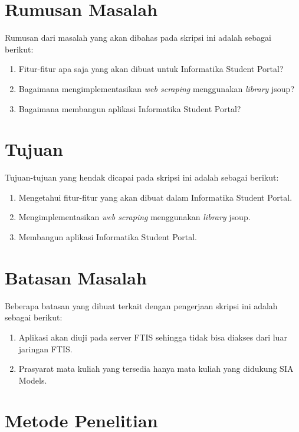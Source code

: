 \section{Rumusan Masalah}
\label{sec:rumusan_masalah}

Rumusan dari masalah yang akan dibahas pada skripsi ini adalah sebagai
berikut:
\begin{enumerate}
	\item Fitur-fitur apa saja yang akan dibuat untuk Informatika Student Portal?
	\item Bagaimana mengimplementasikan \textit{web scraping} menggunakan \textit{library} jsoup?
	\item Bagaimana membangun aplikasi Informatika Student Portal?
\end{enumerate}

\section{Tujuan}
\label{sec:tujuan}

Tujuan-tujuan yang hendak dicapai pada skripsi ini adalah sebagai berikut:
\begin{enumerate}
	\item	Mengetahui fitur-fitur yang akan dibuat dalam Informatika Student Portal.
	\item	Mengimplementasikan \textit{web scraping} menggunakan \textit{library} jsoup.
	\item Membangun aplikasi Informatika Student Portal.
\end{enumerate}

\section{Batasan Masalah}
\label{sec:batasan_masalah}

Beberapa batasan yang dibuat terkait dengan pengerjaan skripsi ini adalah sebagai berikut:
\begin{enumerate}
	\item Aplikasi akan diuji pada server FTIS sehingga tidak bisa diakses dari luar jaringan FTIS.
	\item Prasyarat mata kuliah yang tersedia hanya mata kuliah yang didukung SIA Models.
\end{enumerate}

\section{Metode Penelitian}
\label{sec:metode_penelitian}

